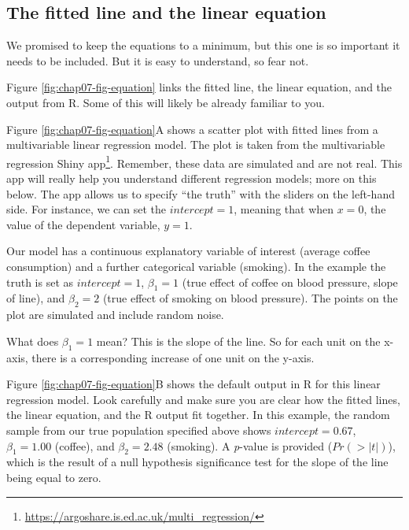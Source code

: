 \documentclass[
  12pt,
  krantz2]{krantz}
\renewcommand{\href}[2]{#2\footnote{\url{#1}}}
\begin{document}
\hypertarget{the-fitted-line-and-the-linear-equation}{%
\subsection{The fitted line and the linear equation}\label{the-fitted-line-and-the-linear-equation}}

We promised to keep the equations to a minimum, but this one is so important it needs to be included.
But it is easy to understand, so fear not.

Figure \ref{fig:chap07-fig-equation} links the fitted line, the linear equation, and the output from R. Some of this will likely be already familiar to you.

Figure \ref{fig:chap07-fig-equation}A shows a scatter plot with fitted lines from a multivariable linear regression model.
The plot is taken from the \href{https://argoshare.is.ed.ac.uk/multi_regression/}{multivariable regression Shiny app}.
Remember, these data are simulated and are not real.
This app will really help you understand different regression models; more on this below.
The app allows us to specify ``the truth'' with the sliders on the left-hand side.
For instance, we can set the \(intercept=1\), meaning that when \(x=0\), the value of the dependent variable, \(y=1\).

Our model has a continuous explanatory variable of interest (average coffee consumption) and a further categorical variable (smoking).
In the example the truth is set as \(intercept=1\), \(\beta_1=1\) (true effect of coffee on blood pressure, slope of line), and \(\beta_2=2\) (true effect of smoking on blood pressure).
The points on the plot are simulated and include random noise.

What does \(\beta_1=1\) mean?
This is the slope of the line.
So for each unit on the x-axis, there is a corresponding increase of one unit on the y-axis.

Figure \ref{fig:chap07-fig-equation}B shows the default output in R for this linear regression model.
Look carefully and make sure you are clear how the fitted lines, the linear equation, and the R output fit together.
In this example, the random sample from our true population specified above shows \(intercept=0.67\), \(\beta_1=1.00\) (coffee), and \(\beta_2=2.48\) (smoking).
A \emph{p}-value is provided (\(Pr(> \left| t \right|)\)), which is the result of a null hypothesis significance test for the slope of the line being equal to zero.
\end{document}
